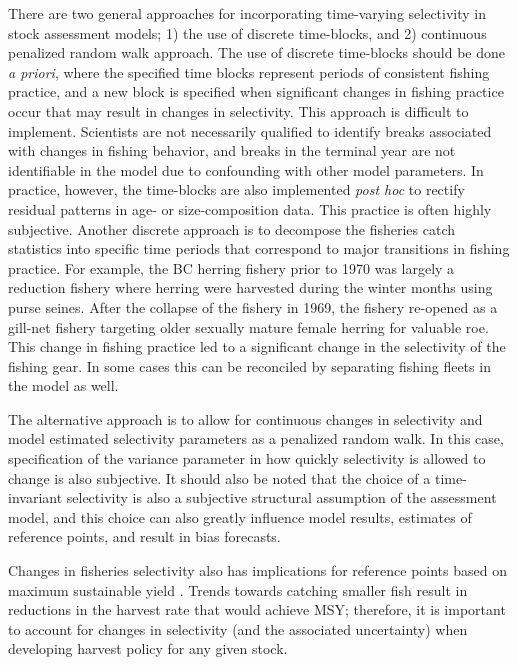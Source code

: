 There are two general approaches for incorporating time-varying selectivity in stock assessment models; 1) the use of discrete time-blocks, and 2) continuous penalized random walk approach.  The use of discrete time-blocks should be done \emph{a priori}, where the specified time blocks represent periods of consistent fishing practice, and a new block is specified when significant changes in fishing practice occur that may result in changes in selectivity. This approach is difficult to implement.  Scientists are not necessarily qualified to identify breaks associated with changes in fishing behavior, and breaks in the terminal year are not identifiable in the model due to confounding with other model parameters. In practice, however, the time-blocks are also implemented \emph{post hoc} to rectify residual patterns in age- or size-composition data. This practice is often highly subjective.  Another discrete approach is to decompose the fisheries catch statistics into specific time periods that correspond to major transitions in fishing practice.  For example, the BC herring fishery prior to 1970 was largely a reduction fishery where herring were harvested during the winter months using purse seines.  After the collapse of the fishery in 1969, the fishery re-opened as a gill-net fishery targeting older sexually mature female herring for valuable roe.  This change in fishing practice led to a significant change in the selectivity of the fishing gear.  In some cases this can be reconciled by separating fishing fleets in the model as well.

The alternative approach is to allow for continuous changes in selectivity and model estimated selectivity parameters as a penalized random walk. In this case, specification of the variance parameter in how quickly selectivity is allowed to change is also subjective.  It should also be noted that the choice of a time-invariant selectivity is also a subjective structural assumption of the assessment model, and this choice can also greatly influence model results, estimates of reference points, and result in bias forecasts.



Changes in fisheries selectivity also has implications for reference points based on maximum sustainable yield \citep[MSY,][]{beverton1993dynamics}.  Trends towards catching smaller fish result in reductions in the harvest rate that would achieve MSY; therefore, it is important to account for changes in selectivity (and the associated uncertainty) when developing harvest policy for any given stock.


